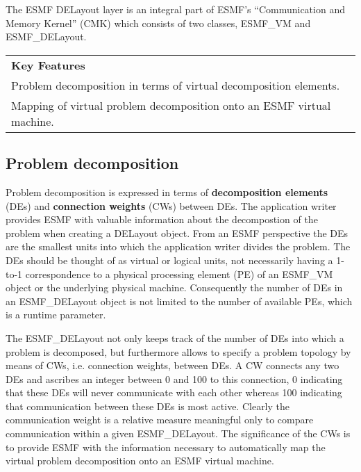 
The ESMF DELayout layer is an integral part of ESMF's ``Communication and Memory Kernel'' (CMK) which consists of two classes, ESMF\_VM and ESMF\_DELayout.
\begin{center}  
\begin{tabular}{|p{6in}|}
\hline
\vspace{.01in}
{\bf Key Features} \\[.01in]
Problem decomposition in terms of virtual decomposition elements.\\
Mapping of virtual problem decomposition onto an ESMF virtual machine.\\[.03in] \hline
\end{tabular}
\end{center}

\subsection{Problem decomposition}
Problem decomposition is expressed in terms of {\bf decomposition elements} (DEs) and {\bf connection weights} (CWs) between DEs. The application writer provides ESMF with valuable information about the decompostion of the problem when creating a DELayout object. From an ESMF perspective the DEs are the smallest units into which the application writer divides the problem. The DEs should be thought of as virtual or logical units, not necessarily having a 1-to-1 correspondence to a physical processing element (PE) of an ESMF\_VM object or the underlying physical machine. Consequently the number of DEs in an ESMF\_DELayout object is not limited to the number of available PEs, which is a runtime parameter.

The ESMF\_DELayout not only keeps track of the number of DEs into which a problem is decomposed, but furthermore allows to specify a problem topology by means of CWs, i.e. connection weights, between DEs. A CW connects any two DEs and ascribes an integer between 0 and 100 to this connection, 0 indicating that these DEs will never communicate with each other whereas 100 indicating that communication between these DEs is most active. Clearly the communication weight is a relative measure meaningful only to compare communication within a given ESMF\_DELayout. The significance of the CWs is to provide ESMF with the information necessary to automatically map the virtual problem decomposition onto an ESMF virtual machine.

